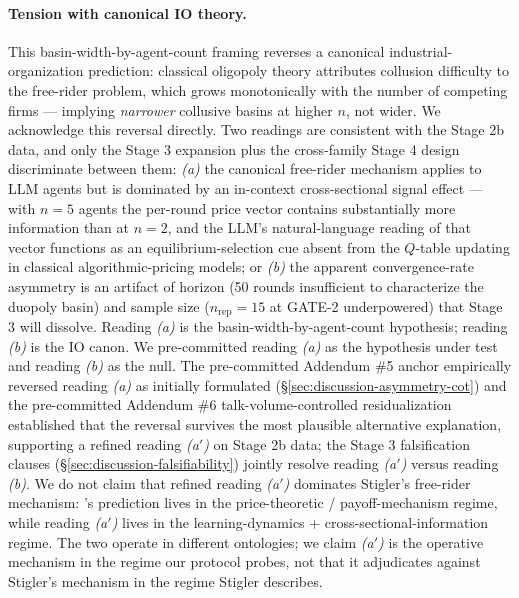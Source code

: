 \paragraph{Tension with canonical IO theory.}
This basin-width-by-agent-count framing reverses a canonical industrial-organization prediction: classical oligopoly theory \citep{stigler_1964_theory_of_oligopoly} attributes collusion difficulty to the free-rider problem, which grows monotonically with the number of competing firms --- implying \emph{narrower} collusive basins at higher $n$, not wider. We acknowledge this reversal directly. Two readings are consistent with the Stage 2b data, and only the Stage 3 expansion plus the cross-family Stage 4 design discriminate between them: \emph{(a)} the canonical free-rider mechanism applies to LLM agents but is dominated by an in-context cross-sectional signal effect --- with $n=5$ agents the per-round price vector contains substantially more information than at $n=2$, and the LLM's natural-language reading of that vector functions as an equilibrium-selection cue absent from the $Q$-table updating in classical algorithmic-pricing models; or \emph{(b)} the apparent convergence-rate asymmetry is an artifact of horizon (50 rounds insufficient to characterize the duopoly basin) and sample size ($n_{\text{rep}} = 15$ at GATE-2 underpowered) that Stage 3 will dissolve. Reading \emph{(a)} is the basin-width-by-agent-count hypothesis; reading \emph{(b)} is the IO canon. We pre-committed reading \emph{(a)} as the hypothesis under test and reading \emph{(b)} as the null. The pre-committed Addendum \#5 anchor empirically reversed reading \emph{(a)} as initially formulated (\S\ref{sec:discussion-asymmetry-cot}) and the pre-committed Addendum \#6 talk-volume-controlled residualization established that the reversal survives the most plausible alternative explanation, supporting a refined reading \emph{(a$'$)} on Stage 2b data; the Stage 3 falsification clauses (\S\ref{sec:discussion-falsifiability}) jointly resolve reading \emph{(a$'$)} versus reading \emph{(b)}. We do not claim that refined reading \emph{(a$'$)} dominates Stigler's free-rider mechanism: \citet{stigler_1964_theory_of_oligopoly}'s prediction lives in the price-theoretic / payoff-mechanism regime, while reading \emph{(a$'$)} lives in the learning-dynamics + cross-sectional-information regime. The two operate in different ontologies; we claim \emph{(a$'$)} is the operative mechanism in the regime our protocol probes, not that it adjudicates against Stigler's mechanism in the regime Stigler describes.

